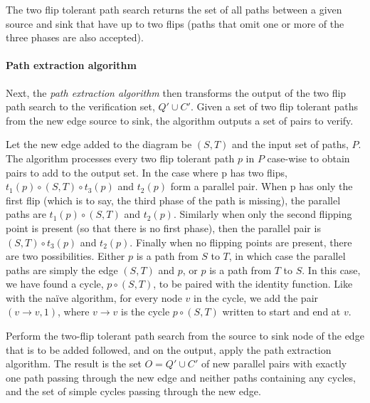 \documentclass[sigplan,review,anonymous]{acmart}
\begin{document}
The two flip tolerant path search returns the set of all paths between a given source and sink that have up to two flips (paths that omit one or more of the three phases are also accepted).

\paragraph{Path extraction algorithm}
Next, the \textit{path extraction algorithm} then transforms the output of the two flip path search to the verification set, $Q' \cup C'$.
Given a set of two flip tolerant paths from the new edge source to sink, the algorithm outputs a set of pairs to verify.

Let the new edge added to the diagram be $(S, T)$ and the input set of paths, $P$.
The algorithm processes every two flip tolerant path $p$ in $P$ case-wise to obtain pairs to add to the output set.
In the case where p has two flips, $t_1(p) \circ (S, T) \circ t_3(p)$ and $t_2(p)$ form a parallel pair.
When p has only the first flip (which is to say, the third phase of the path is missing), the parallel paths are $t_1(p) \circ (S, T)$ and $t_2(p)$.
Similarly when only the second flipping point is present (so that there is no first phase), then the parallel pair is  $(S, T) \circ t_3(p)$ and $t_2(p)$.
Finally when no flipping points are present, there are two possibilities.
Either $p$ is a path from $S$ to $T$, in which case the parallel paths are simply the edge $(S, T)$ and $p$, or $p$ is a path from $T$ to $S$.
In this case, we have found a cycle, $p \circ (S,T)$, to be paired with the identity function.
Like with the na\"{i}ve algorithm, for every node $v$ in the cycle, we add the pair $(v \rightarrow v, 1)$, where $v \rightarrow v$ is the cycle $p \circ (S,T)$ written to start and end at $v$.


\begin{theorem}
    Perform the two-flip tolerant path search from the source to sink node of the edge that is to be added followed, and on the output, apply the path extraction algorithm. 
    The result is the set $O = Q'\cup C'$ of new parallel pairs with exactly one path passing through the new edge and neither paths containing any cycles, and the set of simple cycles passing through the new edge.
\end{theorem}
\end{document}
